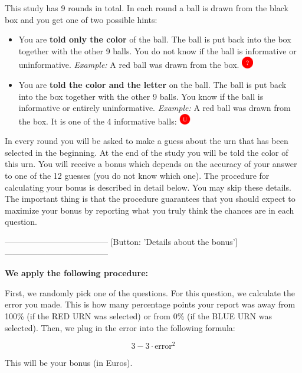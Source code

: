 This study has 9 rounds in total. In each round a ball is drawn from the black box and you get one of two possible hints: 
\begin{itemize}
    \item You are \textbf{told only the color} of the ball. The ball is put back into the box together with the other 9 balls. You do not know if the ball is informative or uninformative. \textit{Example:} A red ball was drawn from the box. \includegraphics[width=0.5cm]{instructions/red_ball_q.png}
    \item You are \textbf{told the color and the letter} on the ball. The ball is put back into the box together with the other 9 balls. You know if the ball is informative or entirely uninformative. \textit{Example:} A red ball was drawn from the box. It is one of the 4 informative balls: \includegraphics[width=0.5cm]{instructions/red_ball_u.png} 
\end{itemize}

\noindent In every round you will be asked to make a guess about the urn that has been selected in the beginning. At the end of the study you will be told the color of this urn. You will receive a bonus which depends on the accuracy of your answer to one of the 12 guesses (you do not know which one). The procedure for calculating your bonus is described in detail below. You may skip these details. The important thing is that the procedure guarantees that you should expect to maximize your bonus by reporting what you truly think the chances are in each question. 

-------------------------------------- [Button: 'Details about the bonus'] --------------------------------------

\noindent\textbf{We apply the following procedure: 
}

\noindent First, we randomly pick one of the questions. For this question, we calculate the error you made. This is how many percentage points your report was away from 100\% (if the RED URN was selected) or from 0\% (if the BLUE URN was selected). Then, we plug in the error into the following formula: 

$$3-3 \cdot \text{error}^2$$

 \noindent This will be your bonus (in Euros). 

